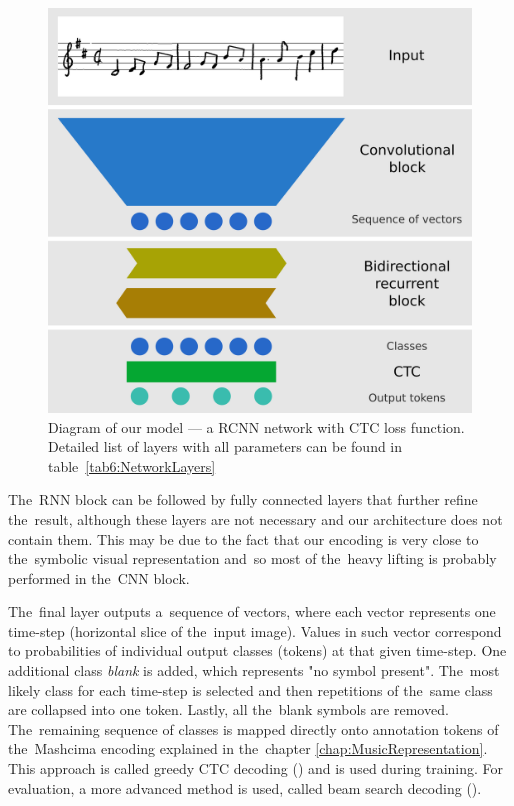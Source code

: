 \begin{figure}[h]
    \centering
    \includegraphics[width=140mm]{../img/network-architecture}
    \caption{Diagram of our model --- a RCNN network with CTC loss function. Detailed list of layers with all parameters can be found in table~\ref{tab6:NetworkLayers}}
    \label{fig3:NetworkArchitecture}
\end{figure}

The~RNN block can be followed by fully connected layers that further refine the~result, although these layers are not necessary and our architecture does not contain them. This may be due to the fact that our encoding is very close to the~symbolic visual representation and~so most of the~heavy lifting is probably performed in the~CNN block.

The~final layer outputs a~sequence of vectors, where each vector represents one time-step (horizontal slice of the~input image). Values in such vector correspond to probabilities of individual output classes (tokens) at that given time-step. One additional class \emph{blank} is added, which represents "no symbol present". The~most likely class for each time-step is selected and then repetitions of the~same class are collapsed into one token. Lastly, all the~blank symbols are removed. The~remaining sequence of classes is mapped directly onto annotation tokens of the~Mashcima encoding explained in the~chapter \ref{chap:MusicRepresentation}. This approach is called greedy CTC decoding (\cite{CTC}) and is used during training. For evaluation, a more advanced method is used, called beam search decoding (\cite{CtcBeamSearch}).

